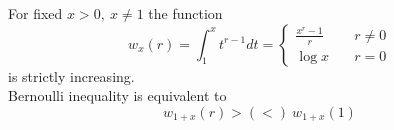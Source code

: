 \documentclass[12pt]{article}
\begin{document}
For fixed $x>0,\ x\neq 1$ the function
$$
w_x(r)=\int_1^x t^{r-1} dt=
\begin{cases} \frac{x^r-1}{r}\quad& r\neq 0\\
\log x\quad& r=0
\end{cases}
$$
is strictly increasing.\\
Bernoulli inequality is equivalent to
$$ w_{1+x}(r) > (<)\ w_{1+x}(1)$$
\end{document}
